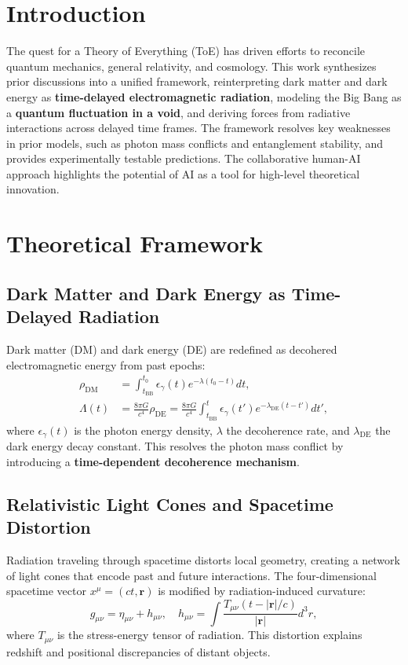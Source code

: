 \documentclass[12pt, a4paper]{article}
\begin{document}
\section{Introduction}
The quest for a Theory of Everything (ToE) has driven efforts to reconcile quantum mechanics, general relativity, and cosmology. This work synthesizes prior discussions into a unified framework, reinterpreting dark matter and dark energy as \textbf{time-delayed electromagnetic radiation}, modeling the Big Bang as a \textbf{quantum fluctuation in a void}, and deriving forces from radiative interactions across delayed time frames. The framework resolves key weaknesses in prior models, such as photon mass conflicts and entanglement stability, and provides experimentally testable predictions. The collaborative human-AI approach highlights the potential of AI as a tool for high-level theoretical innovation.

\section{Theoretical Framework}
\subsection{Dark Matter and Dark Energy as Time-Delayed Radiation}
Dark matter (DM) and dark energy (DE) are redefined as decohered electromagnetic energy from past epochs:
\begin{align}
\rho_{\text{DM}} &= \int_{t_{\text{BB}}}^{t_0} \epsilon_{\gamma}(t) e^{-\lambda (t_0 - t)} dt, \label{eq:dm} \\
\Lambda(t) &= \frac{8\pi G}{c^4} \rho_{\text{DE}} = \frac{8\pi G}{c^4} \int_{t_{\text{BB}}}^{t} \epsilon_{\gamma}(t') e^{-\lambda_{\text{DE}} (t - t')} dt', \label{eq:de}
\end{align}
where \( \epsilon_{\gamma}(t) \) is the photon energy density, \( \lambda \) the decoherence rate, and \( \lambda_{\text{DE}} \) the dark energy decay constant. This resolves the photon mass conflict by introducing a \textbf{time-dependent decoherence mechanism}.

\subsection{Relativistic Light Cones and Spacetime Distortion}
Radiation traveling through spacetime distorts local geometry, creating a network of light cones that encode past and future interactions. The four-dimensional spacetime vector \( x^\mu = (ct, \bm{r}) \) is modified by radiation-induced curvature:
\begin{equation}
g_{\mu\nu} = \eta_{\mu\nu} + h_{\mu\nu}, \quad h_{\mu\nu} = \int \frac{T_{\mu\nu}(t - |\bm{r}|/c)}{|\bm{r}|} d^3r, \label{eq:metric_pert}
\end{equation}
where \( T_{\mu\nu} \) is the stress-energy tensor of radiation. This distortion explains redshift and positional discrepancies of distant objects.
\end{document}
